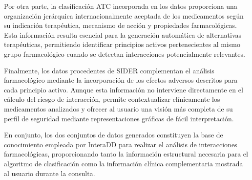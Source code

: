 Por otra parte, la clasificación ATC incorporada en los datos proporciona una organización jerárquica internacionalmente aceptada de los medicamentos según su indicación terapéutica, mecanismo de acción y propiedades farmacológicas. Esta información resulta esencial para la generación automática de alternativas terapéuticas, permitiendo identificar principios activos pertenecientes al mismo grupo farmacológico cuando se detectan interacciones potencialmente relevantes.

Finalmente, los datos procedentes de SIDER complementan el análisis farmacológico mediante la incorporación de los efectos adversos descritos para cada principio activo. Aunque esta información no interviene directamente en el cálculo del riesgo de interacción, permite contextualizar clínicamente los medicamentos analizados y ofrecer al usuario una visión más completa de su perfil de seguridad mediante representaciones gráficas de fácil interpretación.

En conjunto, los dos conjuntos de datos generados constituyen la base de conocimiento empleada por InteraDD para realizar el análisis de interacciones farmacológicas, proporcionando tanto la información estructural necesaria para el algoritmo de clasificación como la información clínica complementaria mostrada al usuario durante la consulta.
